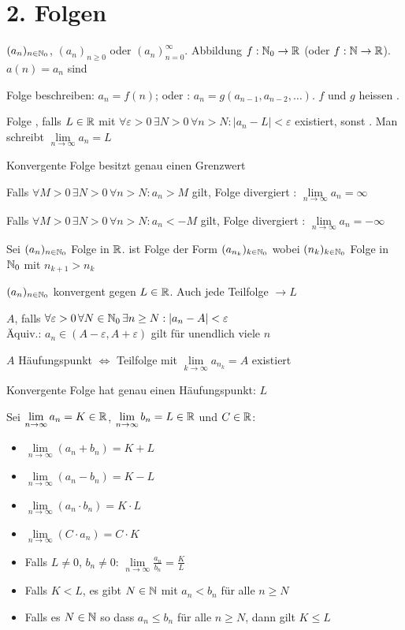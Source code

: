 \section{2. Folgen}
\Def {} $(a_n)_{n \in \mathbb{N}_0}$, $(a_n)_{n\ge 0}$ oder $(a_n)_{n=0}^\infty$. 
Abbildung $f : \mathbb{N}_0 \to \mathbb{R}$ (oder $f : \mathbb{N} \to \mathbb{R}$).  $a(n) = a_n$
sind 

\Def Folge  beschreiben: $a_n = f(n)$;
oder : $a_n = g(a_{n-1}, a_{n-2}, \ldots)$.
$f$ und $g$ heissen .

\Def Folge , falls  $L \in \mathbb{R}$ mit
$\forall \varepsilon > 0 \, \exists N > 0 \, \forall n > N : |a_n - L| < \varepsilon$
existiert, sonst .
Man schreibt $\lim\limits_{n \to \infty} a_n = L$

\Satz Konvergente Folge besitzt genau einen Grenzwert

\Def Falls $\forall M > 0 \, \exists N > 0 \, \forall n > N : a_n > M$ gilt,
Folge divergiert : $\lim\limits_{n\to\infty}a_n = \infty$

Falls $\forall M > 0 \, \exists N > 0 \, \forall n > N : a_n < -M$ gilt,
Folge divergiert : $\lim\limits_{n\to\infty} a_n = -\infty$

\Def Sei $(a_n)_{n \in \mathbb{N}_0}$ Folge in $\mathbb{R}$.
 ist Folge der Form $(a_{n_k})_{k \in \mathbb{N}_0}$
wobei $(n_k)_{k \in \mathbb{N}_0}$ Folge in $\mathbb{N}_0$ mit $n_{k+1} > n_k$

\Satz $(a_n)_{n \in \mathbb{N}_0}$ konvergent gegen $L \in \mathbb{R}$. Auch jede Teilfolge $\to L$

\Def {} $A$, falls
$\forall \varepsilon > 0 \, \forall N \in \mathbb{N}_0 \, \exists n\ge N : |a_n - A| < \varepsilon$ \\
Äquiv.: $a_n \in (A-\varepsilon, A+\varepsilon)$ gilt für unendlich viele $n$

\Satz $A$ Häufungspunkt $\iff$ Teilfolge mit $\lim\limits_{k \to \infty} a_{n_k} = A$ existiert

\Kor Konvergente Folge hat genau einen Häufungspunkt: $L$

\Satz Sei $\lim\limits_{n\to\infty} a_n = K \in \mathbb{R}$,
$\lim\limits_{n\to\infty} b_n = L \in \mathbb{R}$ und $C \in \mathbb{R}$:
\vspace{-0.6em}
\begin{itemize}
    \item $\lim\limits_{n\to\infty}(a_n + b_n) = K + L$
    \item $\lim\limits_{n\to\infty}(a_n - b_n) = K - L$
    \item $\lim\limits_{n\to\infty}(a_n \cdot b_n) = K \cdot L$
    \item $\lim\limits_{n\to\infty}(C \cdot a_n) = C \cdot K$
    \item Falls $L\ne 0$, $b_n\ne 0$: $\lim\limits_{n\to\infty}\frac{a_n}{b_n} = \frac{K}{L}$
    \item Falls $K < L$, es gibt $N \in \mathbb{N}$ mit $a_n < b_n$ für alle $n\ge N$
    \item Falls es $N \in \mathbb{N}$ so dass $a_n\le b_n$ für alle $n\ge N$, dann gilt $K\le L$
\end{itemize}

